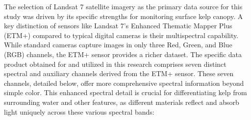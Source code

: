 \documentclass{article}
\begin{document}
The selection of Landsat 7 satellite imagery as the primary data source for this study was driven by its specific strengths for monitoring surface kelp canopy. A key distinction of sensors like Landsat 7's Enhanced Thematic Mapper Plus (ETM+) compared to typical digital cameras is their multispectral capability. While standard cameras capture images in only three Red, Green, and Blue (RGB) channels, the ETM+ sensor provides a richer dataset. The specific data product obtained for and utilized in this research comprises seven distinct spectral and auxiliary channels derived from the ETM+ sensor. These seven channels, detailed below, offer more comprehensive spectral information beyond simple color. This enhanced spectral detail is crucial for differentiating kelp from surrounding water and other features, as different materials reflect and absorb light uniquely across these various spectral bands:
\end{document}
